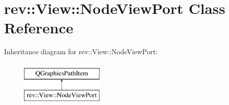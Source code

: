 \hypertarget{classrev_1_1_view_1_1_node_view_port}{}\section{rev\+::View\+::Node\+View\+Port Class Reference}
\label{classrev_1_1_view_1_1_node_view_port}
Inheritance diagram for rev\+::View\+::Node\+View\+Port\+:\begin{figure}[H]
\begin{center}
\leavevmode
\includegraphics[height=2.000000cm]{classrev_1_1_view_1_1_node_view_port}
\end{center}
\end{figure}
